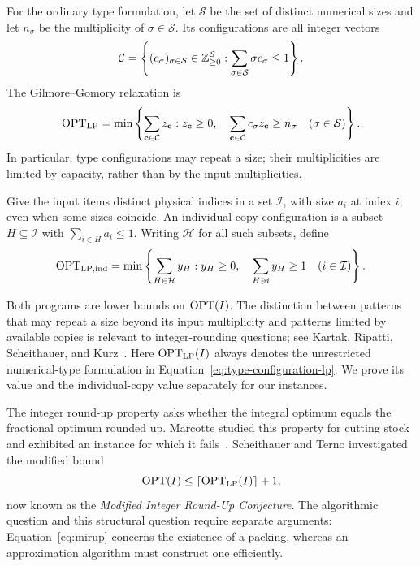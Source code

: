 \begin{definition}\label{def:configuration-lp}
For the ordinary type formulation, let $\mathcal S$ be the set of
distinct numerical sizes and let $n_\sigma$ be the multiplicity of
$\sigma\in\mathcal S$.  Its configurations are all integer vectors
\[
 \mathcal C=\left\{(c_\sigma)_{\sigma\in\mathcal S}
       \in\mathbb Z_{\ge0}^{\mathcal S}:
       \sum_{\sigma\in\mathcal S}\sigma c_\sigma\le1\right\}.
\]
The Gilmore--Gomory relaxation is
\begin{equation}\label{eq:type-configuration-lp}
 \operatorname{OPT}_{\mathrm{LP}}=
 \min\left\{\sum_{\mathbf c\in\mathcal C}z_{\mathbf c}:
       z_{\mathbf c}\ge0,\quad
       \sum_{\mathbf c\in\mathcal C}c_\sigma z_{\mathbf c}
          \ge n_\sigma\quad(\sigma\in\mathcal S)\right\}.
\end{equation}
In particular, type configurations may repeat a size; their
multiplicities are limited by capacity, rather than by the input
multiplicities.

Give the input items distinct physical indices in a set $\mathcal I$,
with size $a_i$ at index $i$, even when some sizes coincide.
An individual-copy configuration
is a subset $H\subseteq\mathcal I$ with $\sum_{i\in H}a_i\le1$.
Writing $\mathcal H$ for all such subsets, define
\begin{equation}\label{eq:individual-configuration-lp}
 \operatorname{OPT}_{\mathrm{LP,ind}}=
 \min\left\{\sum_{H\in\mathcal H}y_H:
       y_H\ge0,\quad
       \sum_{H\ni i}y_H\ge1\quad(i\in\mathcal I)\right\}.
\end{equation}
\end{definition}

Both programs are lower bounds on $\operatorname{OPT}(I)$. The distinction between
patterns that may repeat a size beyond its input multiplicity and patterns
limited by available copies is relevant to integer-rounding questions;
see Kartak, Ripatti, Scheithauer, and Kurz~\cite{KartakRipattiScheithauerKurz2015}.
Here $\operatorname{OPT}_{\mathrm{LP}}(I)$ always denotes the unrestricted numerical-type formulation
in Equation~\eqref{eq:type-configuration-lp}. We prove its value and the
individual-copy value separately for our instances.

The integer round-up property asks whether the integral optimum equals
the fractional optimum rounded up. Marcotte studied this property for
cutting stock and exhibited an instance for which it
fails~\cite{Marcotte1985,Marcotte1986}. Scheithauer and Terno investigated
the modified bound~\cite{ScheithauerTerno1995,ScheithauerTerno1997}
\begin{equation}\label{eq:mirup}
  \operatorname{OPT}(I)\le \lceil\operatorname{OPT}_{\mathrm{LP}}(I)\rceil+1,
\end{equation}
now known as the \emph{Modified Integer Round-Up Conjecture}.
The algorithmic question and this structural question require separate
arguments: Equation~\eqref{eq:mirup} concerns the existence of a packing,
whereas an approximation algorithm must construct one efficiently.

